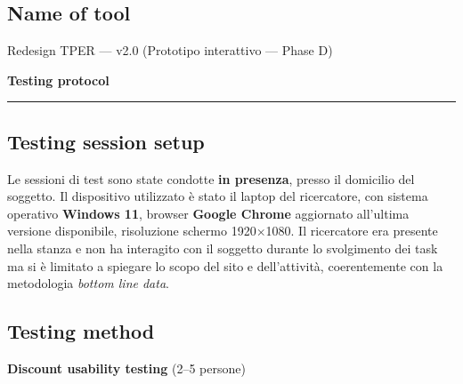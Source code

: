 ﻿\documentclass[11pt,a4paper]{article}
\begin{document}
\vspace{0.2cm}

\subsection*{Name of tool}
\begin{tcolorbox}[base]
Redesign TPER --- v2.0 (Prototipo interattivo --- Phase D)
\end{tcolorbox}

\vspace{0.2cm}

\begin{center}
  {\color{primaryColor}\large\bfseries Testing protocol}
  \vspace{0.1cm}
  \color{borderColor}\hrule
\end{center}

\vspace{0.2cm}

\subsection*{Testing session setup}
\begin{tcolorbox}[base]
Le sessioni di test sono state condotte \textbf{in presenza},
presso il domicilio del soggetto. Il dispositivo utilizzato è
stato il laptop del ricercatore, con sistema operativo
\textbf{Windows 11}, browser \textbf{Google Chrome} aggiornato
all'ultima versione disponibile, risoluzione schermo 1920$\times$1080.
Il ricercatore era presente nella stanza e non ha interagito
con il soggetto durante lo svolgimento dei task ma si è limitato
a spiegare lo scopo del sito e dell'attività, coerentemente
con la metodologia \textit{bottom line data}.
\end{tcolorbox}

\vspace{0.2cm}

\subsection*{Testing method}
\textbf{Discount usability testing} (2--5 persone)

\vspace{0.2cm}
\end{document}
